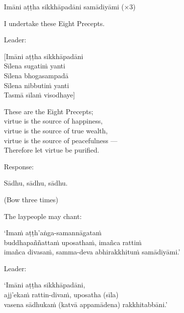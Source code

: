 Imāni aṭṭha sikkhāpadāni samādiyāmi (×3)

\begin{english}
  I undertake these Eight Precepts.
\end{english}

\begin{instruction}
  Leader:
\end{instruction}

\ifhandbookedition
\enlargethispage{\baselineskip}
\fi

[Imāni aṭṭha sikkhāpadāni\\
Sīlena sugatiṁ yanti\\
Sīlena bhogasampadā\\
Sīlena nibbutiṁ yanti\\
Tasmā sīlaṁ visodhaye]

\begin{english}
  These are the Eight Precepts;\\
  virtue is the source of happiness,\\
  virtue is the source of true wealth,\\
  virtue is the source of peacefulness ---\\
  Therefore let virtue be purified.
\end{english}

\begin{instruction}
  Response:
\end{instruction}

Sādhu, sādhu, sādhu.

\begin{instruction}
  (Bow three times)
\end{instruction}


\begin{instruction}
  The laypeople may chant:
\end{instruction}

‘Imaṁ aṭṭh'aṅga-samannāgataṁ\\
buddhapaññattaṁ uposathaṁ, imañca rattiṁ\\
imañca divasaṁ, samma-deva abhirakkhituṁ samādiyāmi.’

\begin{instruction}
  Leader:
\end{instruction}

‘Imāni aṭṭha sikkhāpadāni,\\
ajj'ekaṁ rattin-divaṁ, uposatha (sīla)\\
vasena sādhukaṁ (katvā appamādena) rakkhitabbāni.’

